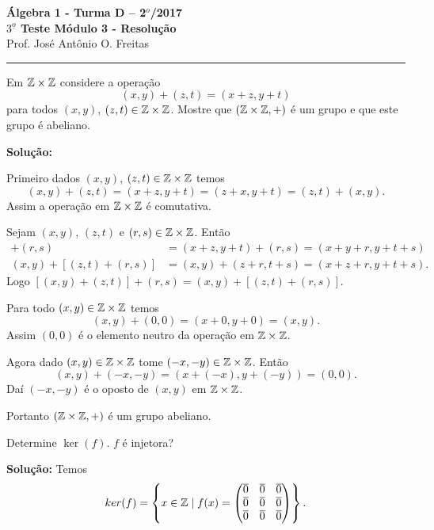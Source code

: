 \documentclass[12pt]{article}
\begin{document}


\begin{center}
{\Large\bf {\'A}lgebra 1 - Turma D -- 2$^{o}$/2017} \\ \vspace{9pt} {\large\bf
  $3^{\underline{o}}$ Teste Módulo 3 - Resolu\c{c}\~ao}\\
\vspace{9pt} Prof. Jos{\'e} Ant{\^o}nio O. Freitas
\end{center}
\hrule

\vspace{.6cm}

\questao Em $\mathbb{Z} \times\mathbb{Z}$ considere a operação
\[
	(x, y) + (z, t) = (x + z, y + t)
\]
para todos $(x,y)$, $(z,t) \in \mathbb{Z}\times\mathbb{Z}$. Mostre que $(\mathbb{Z}\times\mathbb{Z}, +)$ é um grupo e que este grupo é abeliano.

\noindent\textbf{Solu\c{c}\~ao:}

Primeiro dados $(x,y)$, $(z,t) \in \mathbb{Z}\times\mathbb{Z}$ temos
\[
	(x,y) + (z,t) = (x+z,y+t) = (z+x,y+t) = (z,t) + (x,y).
\]
Assim a operação em $\mathbb{Z}\times\mathbb{Z}$ é comutativa.

Sejam $(x,y)$, $(z,t)$ e $(r,s) \in \mathbb{Z}\times\mathbb{Z}$. Então
\begin{align*}
	[(x,y) + (z,t)] + (r,s) &= (x + z, y+t) + (r,s) = (x+y+r,y+t+s)\\
	(x,y) + [(z,t)+(r,s)] &= (x,y) + (z+r,t+s) = (x+z+r,y+t+s).
\end{align*}
Logo $[(x,y)+(z,t)] + (r,s) = (x,y) + [(z,t) + (r,s)]$.

Para todo $(x,y) \in \mathbb{Z}\times\mathbb{Z}$ temos
\[
	(x,y) + (0,0) = (x+0,y+0) = (x,y).
\]
Assim $(0,0)$ é o elemento neutro da operação em $\mathbb{Z}\times\mathbb{Z}$.

Agora dado $(x,y) \in \mathbb{Z}\times\mathbb{Z}$ tome $(-x,-y) \in \mathbb{Z}\times\mathbb{Z}$. Então
\[
	(x,y) + (-x,-y) = (x+(-x),y+(-y)) = (0,0).
\]
Daí $(-x,-y)$ é o oposto de $(x,y)$ em $\mathbb{Z}\times\mathbb{Z}$.

Portanto $(\mathbb{Z}\times\mathbb{Z},+)$ é um grupo abeliano.

\vspace{1cm}

\questao Determine $\ker(f)$. $f$ é injetora?

\noindent\textbf{Solu\c{c}\~ao:} Temos
\[
	ker(f) = \left\{x \in \mathbb{Z} \mid f(x) = \begin{pmatrix}
		\overline{0} & \overline{0} & \overline{0}\\
		\overline{0} & \overline{0} & \overline{0}\\
		\overline{0} & \overline{0} & \overline{0}
	\end{pmatrix}\right\}.
\]
\end{document}

